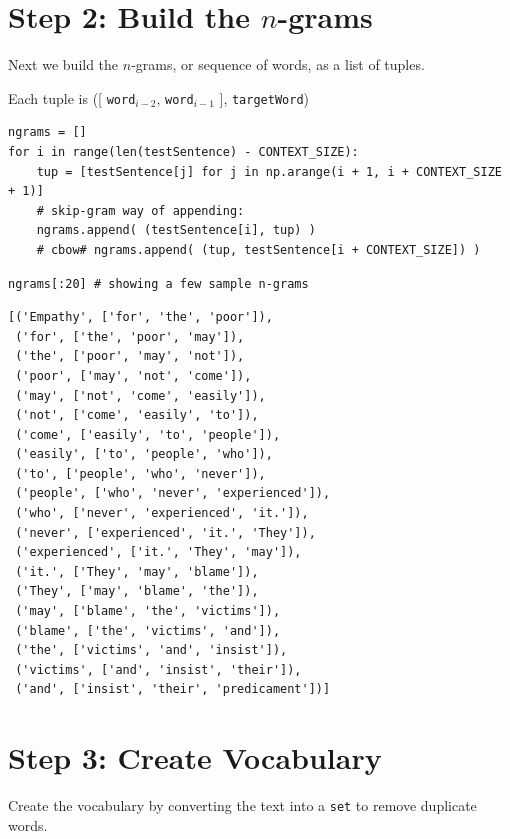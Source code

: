 \documentclass[
]{article}
\begin{document}
\hypertarget{step-2-build-the-n-grams}{%
\section{\texorpdfstring{Step 2: Build the
\(n\)-grams}{Step 2: Build the n-grams}}\label{step-2-build-the-n-grams}}

Next we build the \(n\)-grams, or sequence of words, as a list of
tuples.

Each tuple is ({[} \texttt{word}\(_{i-2}\),
\texttt{word}\(_{i-1}\) {]},
\texttt{targetWord})

\begin{verbatim}
ngrams = []
for i in range(len(testSentence) - CONTEXT_SIZE):
    tup = [testSentence[j] for j in np.arange(i + 1, i + CONTEXT_SIZE + 1)]
    # skip-gram way of appending:
    ngrams.append( (testSentence[i], tup) )
    # cbow# ngrams.append( (tup, testSentence[i + CONTEXT_SIZE]) )
\end{verbatim}

\begin{verbatim}
ngrams[:20] # showing a few sample n-grams
\end{verbatim}

\begin{verbatim}
[('Empathy', ['for', 'the', 'poor']),
 ('for', ['the', 'poor', 'may']),
 ('the', ['poor', 'may', 'not']),
 ('poor', ['may', 'not', 'come']),
 ('may', ['not', 'come', 'easily']),
 ('not', ['come', 'easily', 'to']),
 ('come', ['easily', 'to', 'people']),
 ('easily', ['to', 'people', 'who']),
 ('to', ['people', 'who', 'never']),
 ('people', ['who', 'never', 'experienced']),
 ('who', ['never', 'experienced', 'it.']),
 ('never', ['experienced', 'it.', 'They']),
 ('experienced', ['it.', 'They', 'may']),
 ('it.', ['They', 'may', 'blame']),
 ('They', ['may', 'blame', 'the']),
 ('may', ['blame', 'the', 'victims']),
 ('blame', ['the', 'victims', 'and']),
 ('the', ['victims', 'and', 'insist']),
 ('victims', ['and', 'insist', 'their']),
 ('and', ['insist', 'their', 'predicament'])]
\end{verbatim}

\hypertarget{step-3-create-vocabulary}{%
\section{Step 3: Create Vocabulary}\label{step-3-create-vocabulary}}

Create the vocabulary by converting the text into a
\texttt{set} to remove duplicate words.
\end{document}
